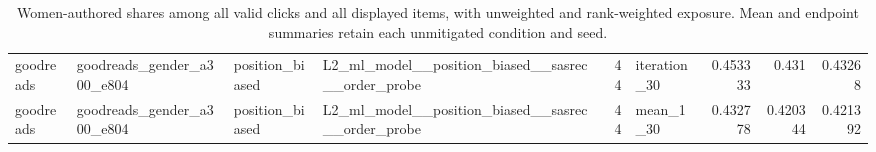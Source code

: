 \begin{table}[htbp!]
\begin{tabular}{llllrlrrr}
goodreads & goodreads\_gender\_a300\_e804 & position\_biased & L2\_ml\_model\_\_position\_biased\_\_sasrec\_\_order\_probe & 44 & iteration\_30 & 0.453333 & 0.431 & 0.43268 \\
goodreads & goodreads\_gender\_a300\_e804 & position\_biased & L2\_ml\_model\_\_position\_biased\_\_sasrec\_\_order\_probe & 44 & mean\_1\_30 & 0.432778 & 0.420344 & 0.421392 \\
\hline
\end{tabular}
\caption{Women-authored shares among all valid clicks and all displayed items, with unweighted and rank-weighted exposure. Mean and endpoint summaries retain each unmitigated condition and seed.}
\label{chap:results:tab:rq7_all_item_gender_summaries}
\end{table}

